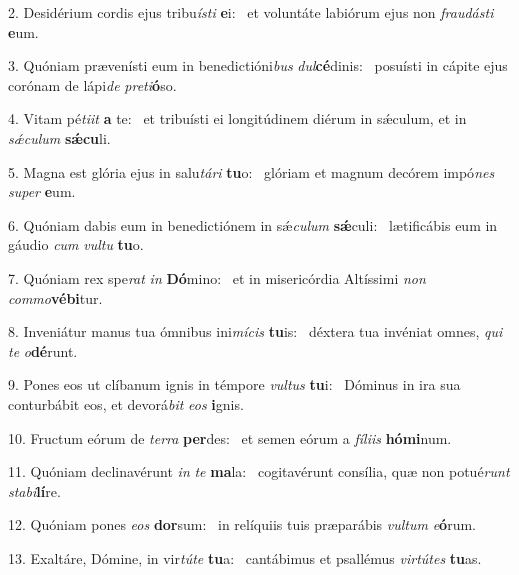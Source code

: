 2. Desidérium cordis ejus tribu\textit{ís}\textit{ti} \textbf{e}i: \ast\  et voluntáte labiórum ejus non \textit{frau}\textit{dás}\textit{ti} \textbf{e}um.\

3. Quóniam prævenísti eum in benedictióni\textit{bus} \textit{dul}\textbf{cé}dinis: \ast\  posuísti in cápite ejus corónam de lápi\textit{de} \textit{pre}\textit{ti}\textbf{ó}so.\

4. Vitam pé\textit{ti}\textit{it} \textbf{a} te: \ast\  et tribuísti ei longitúdinem diérum in sǽculum, et in \textit{sǽ}\textit{cu}\textit{lum} \textbf{sǽ}\textbf{cu}li.\

5. Magna est glória ejus in salu\textit{tá}\textit{ri} \textbf{tu}o: \ast\  glóriam et magnum decórem impó\textit{nes} \textit{su}\textit{per} \textbf{e}um.\

6. Quóniam dabis eum in benedictiónem in sǽ\textit{cu}\textit{lum} \textbf{sǽ}culi: \ast\  lætificábis eum in gáudio \textit{cum} \textit{vul}\textit{tu} \textbf{tu}o.\

7. Quóniam rex spe\textit{rat} \textit{in} \textbf{Dó}mino: \ast\  et in misericórdia Altíssimi \textit{non} \textit{com}\textit{mo}\textbf{vé}\textbf{bi}tur.\

8. Inveniátur manus tua ómnibus ini\textit{mí}\textit{cis} \textbf{tu}is: \ast\  déxtera tua invéniat omnes, \textit{qui} \textit{te} \textit{o}\textbf{dé}runt.\

9. Pones eos ut clíbanum ignis in témpore \textit{vul}\textit{tus} \textbf{tu}i: \ast\  Dóminus in ira sua conturbábit eos, et devorá\textit{bit} \textit{e}\textit{os} \textbf{i}gnis.\

10. Fructum eórum de \textit{ter}\textit{ra} \textbf{per}des: \ast\  et semen eórum a \textit{fí}\textit{li}\textit{is} \textbf{hó}\textbf{mi}num.\

11. Quóniam declinavérunt \textit{in} \textit{te} \textbf{ma}la: \ast\  cogitavérunt consília, quæ non potué\textit{runt} \textit{sta}\textit{bi}\textbf{lí}re.\

12. Quóniam pones \textit{e}\textit{os} \textbf{dor}sum: \ast\  in relíquiis tuis præparábis \textit{vul}\textit{tum} \textit{e}\textbf{ó}rum.\

13. Exaltáre, Dómine, in vir\textit{tú}\textit{te} \textbf{tu}a: \ast\  cantábimus et psallémus \textit{vir}\textit{tú}\textit{tes} \textbf{tu}as.\

